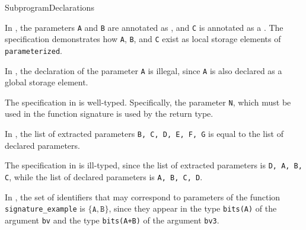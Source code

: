 \begin{TypingRuleList}{SubprogramDeclarations}


In ,
the parameters \verb|A| and \verb|B| are annotated as \parameterizedintegertypesterm,
and \verb|C| is annotated as a \wellconstrainedintegertypeterm.
The specification demonstrates how \verb|A|, \verb|B|, and \verb|C| exist as local storage elements
of \verb|parameterized|.

In , the declaration of the parameter \verb|A| is illegal,
since \verb|A| is also declared as a global storage element.




The specification in  is well-typed.
Specifically, the parameter \verb|N|, which must be used in the function signature is used by the
return type.

In , the list of extracted parameters \verb|B, C, D, E, F, G|
is equal to the list of declared parameters.

The specification in  is ill-typed, since the list of extracted parameters is
\verb|D, A, B, C|, while the list of declared parameters is \verb|A, B, C, D|.




In , the set of identifiers that may correspond
to parameters of the function \texttt{signature\_example} is $\{\texttt{A}, \texttt{B}\}$,
since they appear in the type \texttt{bits(A)}
of the argument \texttt{bv} and the type \texttt{bits(A+B)} of the argument \texttt{bv3}.


\end{TypingRuleList}
